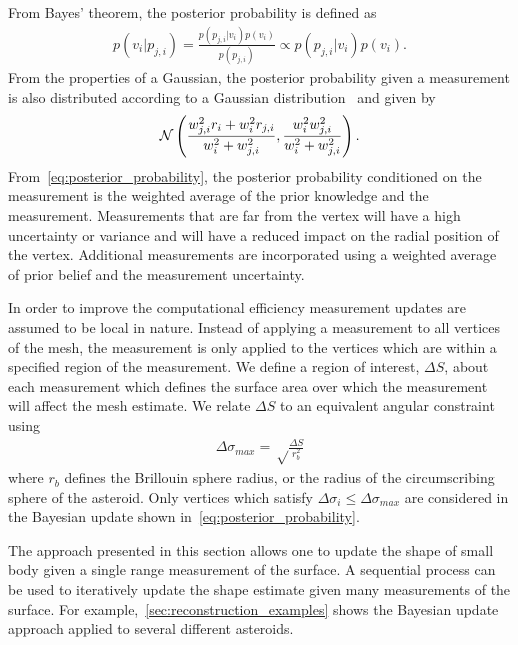 \documentclass[letterpaper, paper,11pt]{AAS}		%
\begin{document}
From Bayes' theorem, the posterior probability is defined as
\begin{align}
    p(v_i | p_{j, i}) = \frac{p(p_{j, i} | v_i) p(v_i)}{p( p_{j, i})} \propto p(p_{j,i} | v_i) p(v_i).
\end{align}
From the properties of a Gaussian, the posterior probability given a measurement is also distributed according to a Gaussian distribution~\cite{bishop2006} and given by
\begin{align}\label{eq:posterior_probability}
    \mathcal{N} \left( \frac{w_{j, i}^2 r_i + w_i^2 r_{j, i}}{w_i^2 + w_{j, i}^2} , \frac{w_i^2  w_{j, i}^2}{w_i^2 +  w_{j, i}^2} \right) .
\end{align}
From~\cref{eq:posterior_probability}, the posterior probability conditioned on the measurement is the weighted average of the prior knowledge and the measurement. 
Measurements that are far from the vertex will have a high uncertainty or variance and will have a reduced impact on the radial position of the vertex.
Additional measurements are incorporated using a weighted average of prior belief and the measurement uncertainty.

In order to improve the computational efficiency measurement updates are assumed to be local in nature.
Instead of applying a measurement to all vertices of the mesh, the measurement is only applied to the vertices which are within a specified region of the measurement. 
We define a region of interest, \( \Delta S \), about each measurement which defines the surface area over which the measurement will affect the mesh estimate.
We relate \( \Delta S \) to an equivalent angular constraint using
\begin{align}\label{eq:region_of_interest}
    \Delta \sigma_{max} = \sqrt \frac{\Delta S}{r_b^2}
\end{align}
where \( r_b \) defines the Brillouin  sphere radius, or the radius of the circumscribing sphere of the asteroid.
Only vertices which satisfy \( \Delta \sigma_i \leq \Delta \sigma_{max} \) are considered in the Bayesian update shown in~\cref{eq:posterior_probability}.

The approach presented in this section allows one to update the shape of small body given a single range measurement of the surface.
A sequential process can be used to iteratively update the shape estimate given many measurements of the surface. 
For example,~\cref{sec:reconstruction_examples} shows the Bayesian update approach applied to several different asteroids.
\end{document}
